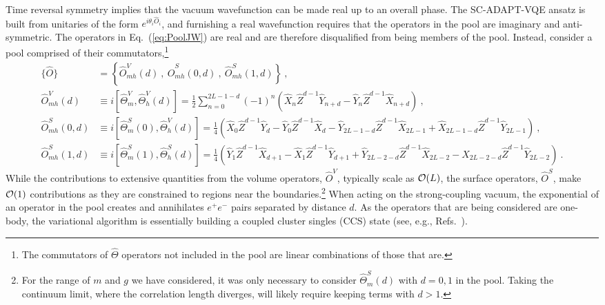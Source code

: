 \documentclass[aps, pra, onecolumn, tightenlines, letterpaper, amsmath, amssymb, preprintnumbers, floatfix, longbibliography, nofootinbib]{revtex4-2}
\begin{document}
Time reversal symmetry implies that the vacuum wavefunction 
can be made real up to an overall phase. 
The SC-ADAPT-VQE ansatz is built from unitaries of the form $e^{i \theta_i \hat{O}_i}$, and furnishing a real wavefunction requires that the 
operators in the pool
are imaginary and anti-symmetric.
The operators in Eq.~(\ref{eq:PoolJW}) are real and are therefore disqualified from being members of the pool.
Instead, consider a pool comprised
of their commutators,\footnote{The commutators of $\hat{\Theta}$ operators not included in the pool are linear combinations of those that are.}
%
\begin{align}
\{ \hat{O} \} &= \left \{ \hat O_{mh}^{V}(d) \ , \ \hat O_{mh}^{S}(0,d) \ , \ \hat O_{mh}^{S}(1,d)
\right \}
\ ,\nonumber\\
 \hat O_{mh}^{V}(d) & \equiv i\left [\hat{\Theta}_m^V, \hat{\Theta}_{h}^V(d)\right ]
 = 
\frac{1}{2}\sum_{n=0}^{2L-1-d}(-1)^n\left (
\hat X_n\hat Z^{d-1}\hat Y_{n+d} - 
\hat Y_n\hat Z^{d-1}\hat X_{n+d} 
\right )
\ ,\nonumber\\
\hat O_{mh}^{S}(0,d) & \equiv i\left [\hat{\Theta}_{m}^S(0), \hat{\Theta}_{h}^V(d) \right ]
 = 
\frac{1}{4}\left (\hat X_0\hat Z^{d-1}\hat Y_{d} - \hat Y_0\hat Z^{d-1}\hat X_{d} 
- \hat Y_{2L-1-d}\hat Z^{d-1}\hat X_{2L-1} + \hat X_{2L-1-d}\hat Z^{d-1}\hat Y_{2L-1}\right ) 
\ ,\nonumber \\
 \hat O_{mh}^{S}(1,d) & \equiv i\left [\hat{\Theta}_{m}^S(1), \hat{\Theta}_{h}^S(d) \right ]
 = 
\frac{1}{4}\left (\hat Y_1\hat Z^{d-1}\hat X_{d+1} - \hat X_1\hat Z^{d-1}\hat Y_{d+1} 
+ \hat Y_{2L-2-d}\hat Z^{d-1}\hat X_{2L-2} - \hat X_{2L-2-d}\hat Z^{d-1}\hat Y_{2L-2} \right )
\ . 
\label{eq:poolComm}
\end{align}
%
While the contributions to extensive quantities from the 
volume operators,
$\hat O^{V}$,
typically scale as ${\cal O}(L)$,  the surface operators, $\hat O^{S}$,
make ${\cal O}(1)$ contributions as they are constrained to regions near the boundaries.\footnote{For the range of $m$ and $g$ we have considered, it was only necessary to consider $\hat{\Theta}_{m}^S(d)$ with $d=0,1$ in the pool.
Taking the continuum limit, where the correlation length diverges, will likely require keeping terms with $d>1$.} 
When acting on the strong-coupling vacuum, 
the exponential of an operator in the pool creates and annihilates $e^+ e^-$ pairs separated 
by distance $d$.
As the operators that are being considered are one-body, 
the variational algorithm is essentially building a coupled cluster singles (CCS) state (see, e.g., Refs.~\cite{RevModPhys.79.291,Hagen:2013nca}).
\end{document}
